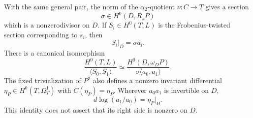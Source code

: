 \begin{lemma}
\label{lem:DE-A3-positive-norm-pencil-candidate}
With the same general pair, the norm of the $\alpha_2$-quotient
$\nu:C\to T$ gives a section
\[
                   \sigma\in H^0(D,R_sP)
\]
which is a nonzerodivisor on $D$. If $S_i\in H^0(T,L)$ is the
Frobenius-twisted section corresponding to $s_i$, then
\[
                         S_i|_D=\sigma a_i.             \tag{DE-TP2}
\]
There is a canonical isomorphism
\[
 \frac{H^0(T,L)}{\langle S_0,S_1\rangle}
 \simeq
 \frac{H^0(D,\omega_DP)}{\sigma\langle a_0,a_1\rangle}.
                                                        \tag{DE-TP3}
\]
The fixed trivialization of $P^2$ also defines a nonzero invariant
differential $\eta_P\in H^0(T,\Omega_T^1)$ with
$C(\eta_P)=\eta_P$. Wherever $a_0a_1$ is invertible on $D$,
\[
                      d\log(a_1/a_0)=\eta_P|_D.         \tag{DE-TP4}
\]
This identity does not assert that its right side is nonzero on $D$.
\end{lemma}
